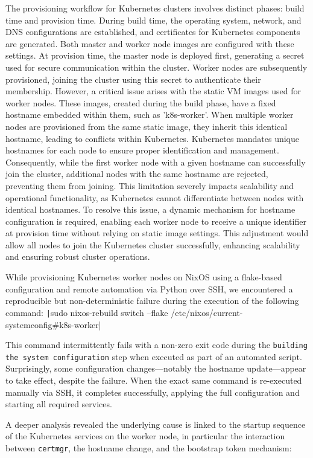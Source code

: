 The provisioning workflow for Kubernetes clusters involves distinct phases: build time and provision time. During build time, the operating system, network, and DNS configurations are established, and certificates for Kubernetes components are generated. Both master and worker node images are configured with these settings. At provision time, the master node is deployed first, generating a secret used for secure communication within the cluster. Worker nodes are subsequently provisioned, joining the cluster using this secret to authenticate their membership. However, a critical issue arises with the static VM images used for worker nodes. These images, created during the build phase, have a fixed hostname embedded within them, such as 'k8s-worker'. When multiple worker nodes are provisioned from the same static image, they inherit this identical hostname, leading to conflicts within Kubernetes. Kubernetes mandates unique hostnames for each node to ensure proper identification and management. Consequently, while the first worker node with a given hostname can successfully join the cluster, additional nodes with the same hostname are rejected, preventing them from joining. This limitation severely impacts scalability and operational functionality, as Kubernetes cannot differentiate between nodes with identical hostnames. To resolve this issue, a dynamic mechanism for hostname configuration is required, enabling each worker node to receive a unique identifier at provision time without relying on static image settings. This adjustment would allow all nodes to join the Kubernetes cluster successfully, enhancing scalability and ensuring robust cluster operations.

While provisioning Kubernetes worker nodes on NixOS using a flake-based configuration and remote automation via Python over SSH, we encountered a reproducible but non-deterministic failure during the execution of the following command:
\texttt|sudo nixos-rebuild switch --flake /etc/nixos/current-systemconfig#k8s-worker|

This command intermittently fails with a non-zero exit code during the \texttt{building the system configuration} step when executed as part of an automated script. Surprisingly, some configuration changes---notably the hostname update---appear to take effect, despite the failure. When the exact same command is re-executed manually via SSH, it completes successfully, applying the full configuration and starting all required services.

A deeper analysis revealed the underlying cause is linked to the startup sequence of the Kubernetes services on the worker node, in particular the interaction between \texttt{certmgr}, the hostname change, and the bootstrap token mechanism:

